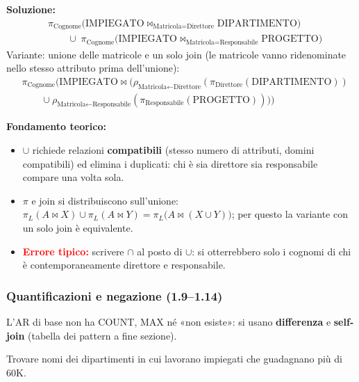 \documentclass[12pt, a4paper]{article}
\begin{document}
\textbf{Soluzione:}
\begin{align*}
&\pi_{\text{Cognome}}\big(\text{IMPIEGATO}\bowtie_{\text{Matricola}=\text{Direttore}}\text{DIPARTIMENTO}\big)\\
&\qquad\cup\;\pi_{\text{Cognome}}\big(\text{IMPIEGATO}\bowtie_{\text{Matricola}=\text{Responsabile}}\text{PROGETTO}\big)
\end{align*}
Variante: unione delle matricole e un solo join (le matricole vanno ridenominate nello stesso attributo prima dell'unione):
\begin{align*}
&\pi_{\text{Cognome}}\Big(\text{IMPIEGATO}\bowtie\big(\rho_{\text{Matricola}\leftarrow\text{Direttore}}(\pi_{\text{Direttore}}(\text{DIPARTIMENTO}))\\
&\qquad\cup\rho_{\text{Matricola}\leftarrow\text{Responsabile}}(\pi_{\text{Responsabile}}(\text{PROGETTO}))\big)\Big)
\end{align*}

\textbf{Fondamento teorico:}
\begin{itemize}
\item $\cup$ richiede relazioni \textbf{compatibili} (stesso numero di attributi, domini compatibili) ed elimina i duplicati: chi è sia direttore sia responsabile compare una volta sola.
\item $\pi$ e join si distribuiscono sull'unione: $\pi_L(A\bowtie X)\cup\pi_L(A\bowtie Y)=\pi_L\big(A\bowtie(X\cup Y)\big)$; per questo la variante con un solo join è equivalente.
\item \textcolor{red}{\textbf{Errore tipico:}} scrivere $\cap$ al posto di $\cup$: si otterrebbero solo i cognomi di chi è contemporaneamente direttore e responsabile.
\end{itemize}

\subsubsection{Quantificazioni e negazione (1.9--1.14)}

L'AR di base non ha COUNT, MAX né «non esiste»: si usano \textbf{differenza} e \textbf{self-join} (tabella dei pattern a fine sezione).

\begin{tcolorbox}[colback=lightergray!10, colframe=tocsec, title=\textbf{Esercizio 1.9}]
Trovare nomi dei dipartimenti in cui lavorano impiegati che guadagnano più di 60K.
\end{tcolorbox}
\end{document}
